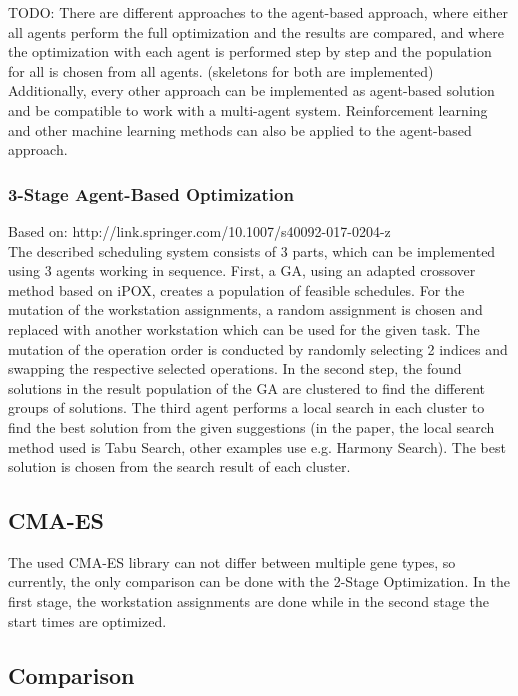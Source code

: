 \documentclass[a4paper,12pt,twoside]{scrreprt}
\begin{document}
\begin{flushleft}
TODO: 
There are different approaches to the agent-based approach, where either all agents perform the full optimization and the results are compared, and where the optimization with each agent is performed step by step and the population for all is chosen from all agents. (skeletons for both are implemented)
\newline
Additionally, every other approach can be implemented as agent-based solution and be compatible to work with a multi-agent system.
Reinforcement learning and other machine learning methods can also be applied to the agent-based approach.


\subsubsection{3-Stage Agent-Based Optimization}
Based on: http://link.springer.com/10.1007/s40092-017-0204-z \\
The described scheduling system consists of 3 parts, which can be implemented using 3 agents working in sequence. First, a GA, using an adapted crossover method based on iPOX, creates a population of feasible schedules. For the mutation of the workstation assignments, a random assignment is chosen and replaced with another workstation which can be used for the given task. The mutation of the operation order is conducted by randomly selecting 2 indices and swapping the respective selected operations.
In the second step, the found solutions in the result population of the GA are clustered to find the different groups of solutions.
The third agent performs a local search in each cluster to find the best solution from the given suggestions (in the paper, the local search method used is Tabu Search, other examples use e.g. Harmony Search).
The best solution is chosen from the search result of each cluster.

\subsection{CMA-ES}
The used CMA-ES library can not differ between multiple gene types, so currently, the only comparison can be done with the 2-Stage Optimization. In the first stage, the workstation assignments are done while in the second stage the start times are optimized. 

\subsection{Comparison}


\end{flushleft}
\end{document}
